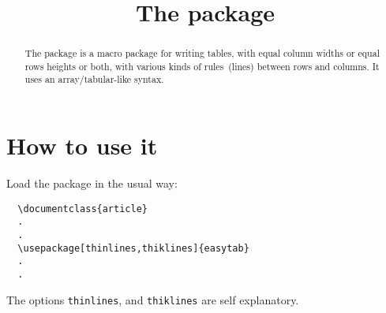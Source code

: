 \documentclass[a4paper]{article}
\title{The package \package{easytable}}
\begin{document}
\maketitle
\begin{abstract}
  The  package is a macro package for writing
  tables, with equal column widths or equal rows heights or both, with
  various kinds of rules~(lines) between rows and columns.  It uses an
  array/tabular-like syntax.
\end{abstract}

\pagestyle{fpage}
\def\sectionmark#1{\markboth{The package \package{easybmat}}{The package \package{easybmat}}}
\let\chaptermark\sectionmark
\let\subsectionmark\sectionmark

\section{How to use it}
Load the package in the usual way:
\begin{verbatim}
  \documentclass{article}
  .
  .
  \usepackage[thinlines,thiklines]{easytab}
  .
  .
\end{verbatim}
The options \texttt{thinlines}, and \texttt{thiklines} are self explanatory.
\end{document}
